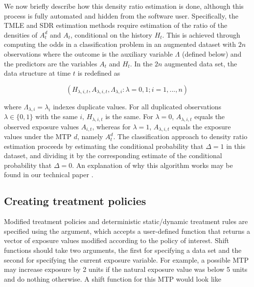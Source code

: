 \documentclass[]{jss}
\begin{document}
We now briefly describe how this density ratio estimation is done,
although this process is fully automated and hidden from the software
user. Specifically, the TMLE and SDR estimation methods require
estimation of the ratio of the densities of $A_t^d$ and $A_t$,
conditional on the history $H_t$. This is achieved through computing
the odds in a classification problem in an augmented dataset with $2n$
observations where the outcome is the auxiliary variable $\Lambda$
(defined below) and the predictors are the variables $A_t$ and
$H_t$. In the $2n$ augmented data set, the data structure at time
\(t\) is redefined as

\begin{equation}
(H_{\lambda, i, t}, A_{\lambda, i, t}, \Lambda_{\lambda, i} : \lambda = 0, 1; i = 1, ..., n)
\end{equation}

where \(\Lambda_{\lambda, i} = \lambda_i\) indexes duplicate values.
For all duplicated observations $\lambda\in\{0,1\}$ with the same $i$,
\(H_{\lambda, i, t}\) is the same. For $\lambda = 0$,
$A_{\lambda, i, t}$ equals the observed exposure values $A_{i, t}$,
whereas for $\lambda=1$, $A_{\lambda, i, t}$ equals the exposure
values under the MTP \(d\), namely \(A^{d}_t\). The classification
approach to density ratio estimation proceeds by estimating the conditional
probability that $\Delta=1$ in this dataset, and dividing it by the
corresponding estimate of the conditional probability that
$\Delta=0$. An explanation of why this algorithm works may be found in
our technical paper  \citep{diazNonparametricCausalEffects2020a}.

\hypertarget{creating-treatment-policies}{%
\subsection{Creating treatment policies}\label{creating-treatment-policies}}

Modified treatment policies and deterministic static/dynamic treatment rules are specified using the  argument, which
accepts a user-defined function that returns a vector of exposure values
modified according to the policy of interest. Shift functions should take two
arguments, the first for specifying a data set and the second for
specifying the current exposure variable. For example, a possible MTP
may increase exposure by 2 units if the natural exposure value was below
5 units and do nothing otherwise. A shift function for this MTP would
look like
\end{document}
